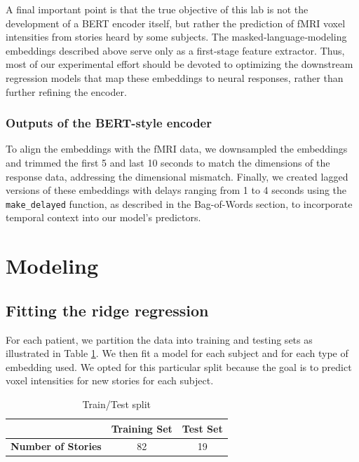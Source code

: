 \documentclass{article}
\begin{document}
A final important point is that the true objective of this lab is not the development of a BERT encoder itself, but rather the prediction of fMRI voxel intensities from stories heard by some subjects. The masked‐language‐modeling embeddings described above serve only as a first‐stage feature extractor. Thus, most of our experimental effort should be devoted to optimizing the downstream regression models that map these embeddings to neural responses, rather than further refining the encoder.

\subsubsection{Outputs of the BERT-style encoder}

To align the embeddings with the fMRI data, we downsampled the embeddings and trimmed the first 5 and last 10 seconds to match the dimensions of the response data, addressing the dimensional mismatch. Finally, we created lagged versions of these embeddings with delays ranging from 1 to 4 seconds using the \texttt{make\_delayed} function, as described in the Bag-of-Words section, to incorporate temporal context into our model's predictors.

\section{Modeling}

\subsection{Fitting the ridge regression}

For each patient, we partition the data into training and testing sets as illustrated in Table \ref{tab:train_test}. We then fit a model for each subject and for each type of embedding used. We opted for this particular split because the goal is to predict voxel intensities for new stories for each subject.\\ 

\begin{table}[h]
\centering
\begin{tabular}{|c|c|c|}
\hline
& \textbf{Training Set} & \textbf{Test Set} \\ \hline
         \textbf{Number of Stories}                  & 82                  & 19                \\ \hline
\end{tabular}
\caption{Train/Test split}
\label{tab:train_test}
\end{table}
\end{document}
